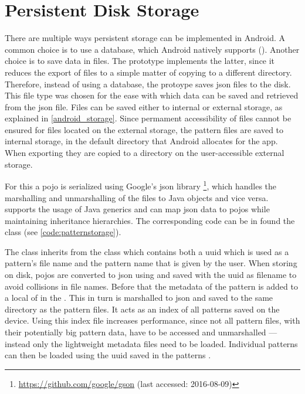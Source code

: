 \section{Persistent Disk Storage}
\label{implementation_storage}
There are multiple ways persistent storage can be implemented in Android. A common choice is to use a  database, which Android natively supports (\cite{android_saving_data}). Another choice is to save data in files. The prototype implements the latter, since it reduces the export of files to a simple matter of copying to a different directory. Therefore, instead of using a database, the protoype saves \gls{json} files to the disk. This file type was chosen for the ease with which data can be saved and retrieved from the \gls{json} file. Files can be saved either to internal or external storage, as explained in \ref{android_storage}. Since permament accessibility of files cannot be ensured for files located on the external storage, the pattern files are saved to internal storage, in the default directory that Android allocates for the app. When exporting they are copied to a directory on the user-accessible external storage. 

For this a  \gls{pojo} is serialized using Google’s \gls{json} library \footnote{\url{https://github.com/google/gson} (last accessed: 2016-08-09)}, which handles the marshalling and unmarshalling of the files to Java objects and vice versa.  supports the usage of Java generics and can map \gls{json} data to \gls{pojo}s while maintaining inheritance hierarchies. The corresponding code can be in found the class  (see \ref{code:patternstorage}).

The  class inherits from the class  which contains both a \gls{uuid} which is used as a pattern's file name and the pattern name that is given by the user. When storing on disk,  \gls{pojo}s are converted to \gls{json} using  and saved with the \gls{uuid} as filename to avoid collisions in file names. Before that the metadata of the pattern is added to a local  of  in the .  This  in turn is marshalled to \gls{json} and saved to the same directory as the pattern files. It acts as an index of all patterns saved on the device. Using this index file increases performance, since not all pattern files, with their potentially big pattern data, have to be accessed and unmarshalled --- instead only the lightweight metadata files need to be loaded. Individual patterns can then be loaded using the \gls{uuid} saved in the patterns .



